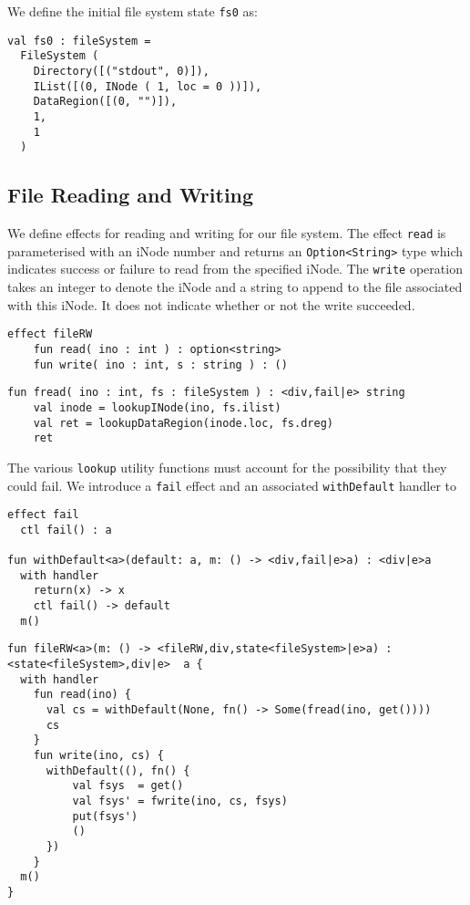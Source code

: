 \documentclass[logo,bsc,singlespacing,parskip]{infthesis}
\begin{document}
We define the initial file system state \texttt{fs0} as:
\begin{lstlisting}
val fs0 : fileSystem =
  FileSystem (
    Directory([("stdout", 0)]),
    IList([(0, INode ( 1, loc = 0 ))]),
    DataRegion([(0, "")]),
    1,
    1
  )
\end{lstlisting}

\subsection*{File Reading and Writing}

We define effects for reading and writing for our file system. The effect \texttt{read} is parameterised with an iNode number and returns an \texttt{Option<String>} type which indicates success or failure to read from the specified iNode. The \texttt{write} operation takes an integer to denote the iNode and a string to append to the file associated with this iNode. It does not indicate whether or not the write succeeded.

\begin{lstlisting}
effect fileRW
    fun read( ino : int ) : option<string>
    fun write( ino : int, s : string ) : ()
\end{lstlisting}



\begin{lstlisting}
fun fread( ino : int, fs : fileSystem ) : <div,fail|e> string
    val inode = lookupINode(ino, fs.ilist)
    val ret = lookupDataRegion(inode.loc, fs.dreg)
    ret
\end{lstlisting}

The various \texttt{lookup} utility functions must account for the possibility that they could fail. We introduce a \texttt{fail} effect and an associated \texttt{withDefault} handler to 

\begin{lstlisting}
effect fail
  ctl fail() : a

fun withDefault<a>(default: a, m: () -> <div,fail|e>a) : <div|e>a
  with handler
    return(x) -> x
    ctl fail() -> default
  m()
\end{lstlisting}

\begin{lstlisting}
fun fileRW<a>(m: () -> <fileRW,div,state<fileSystem>|e>a) : <state<fileSystem>,div|e>  a {
  with handler
    fun read(ino) {
      val cs = withDefault(None, fn() -> Some(fread(ino, get())))
      cs
    }
    fun write(ino, cs) {
      withDefault((), fn() {
          val fsys  = get()
          val fsys' = fwrite(ino, cs, fsys)
          put(fsys')
          ()
      })
    }
  m()
}
\end{lstlisting}
\end{document}
